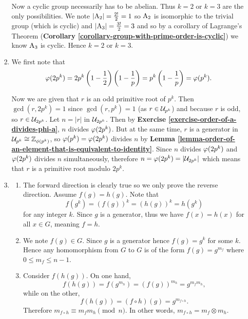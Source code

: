 \begin{enumerate}
    Now a cyclic group necessarily has to be abelian. Thus $k = 2$ or $k = 3$ are the only possibilities. We note $|\mathrm{A}_{2}| = \frac{2!}{2} = 1$ so $\mathrm{A}_{2}$ is isomorphic to the trivial group (which is cyclic) and $|\mathrm{A}_{3}| = \frac{3!}{2} = 3$ and so by a corollary of Lagrange's Theorem (\textbf{Corollary \ref{corollary-group-with-prime-order-is-cyclic}}) we know $\mathrm{A}_{3}$ is cyclic. Hence $k = 2$ or $k = 3$.
    
    \item We first note that
    \[
        \varphi(2p^k) = 2p^k\left(1-\frac12\right)\left(1-\frac1p\right) = p^k\left(1-\frac1p\right) = \varphi(p^k).
    \]

    Now we are given that $r$ is an odd primitive root of $p^k$. Then $\gcd(r, 2p^k) = 1$ since $\gcd(r, p^k) = 1$ (as $r \in \mathcal{U}_{p^k}$) and because $r$ is odd, so $r \in \mathcal{U}_{2p^k}$. Let $n = |r|$ in $\mathcal{U}_{2p^k}$. Then by \textbf{Exercise \ref{exercise-order-of-a-divides-phi-a}}, $n$ divides $\varphi(2p^k)$. But at the same time, $r$ is a generator in $\mathcal{U}_{p^k} \cong \mathbb{Z}_{\phi(p^k)}$, so $\varphi(p^k) = \varphi(2p^k)$ divides $n$ by \textbf{Lemma \ref{lemma-order-of-an-element-that-is-equivalent-to-identity}}. Since $n$ divides $\varphi(2p^k)$ and $\varphi(2p^k)$ divides $n$ simultaneously, therefore $n = \varphi(2p^k) = |\mathcal{U}_{2p^k}|$ which means that $r$ is a primitive root modulo $2p^k$.
    
    \item \begin{enumerate}[label=(\roman*)]
        \item The forward direction is clearly true so we only prove the reverse direction. Assume $f(g) = h(g)$. Note that
        \[
            f(g^k) = (f(g))^k = (h(g))^k = h(g^k)    
        \]
        for any integer $k$. Since $g$ is a generator, thus we have $f(x) = h(x)$ for all $x \in G$, meaning $f = h$.
        
        \item We note $f(g) \in G$. Since $g$ is a generator hence $f(g) = g^k$ for some $k$. Hence any homomorphism from $G$ to $G$ is of the form $f(g) = g^{m_f}$ where $0 \leq m_f \leq n-1$.
        
        \item Consider $f(h(g))$. On one hand,
        \[
            f(h(g)) = f(g^{m_h}) = (f(g))^{m_h} = g^{m_fm_h},
        \]
        while on the other,
        \[
            f(h(g)) = (f \circ h)(g) = g^{m_{f\circ h}}.     
        \]
        Therefore $m_{f\circ h} \equiv m_fm_h \pmod n$. In other words, $m_{f\circ h} = m_f \otimes m_h$.
        

\end{enumerate}
\end{enumerate}

